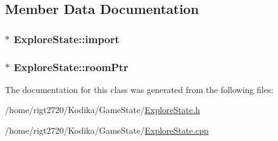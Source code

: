 \subsection{Member Data Documentation}
\hypertarget{classExploreState_aa9bd4b4504c72ae70c440c401f1a60aa}{
\subsubsection[{import}]{$\ast$ Explore\-State\-::import\hspace{0.3cm}{\ttfamily [private]}}}\label{classExploreState_aa9bd4b4504c72ae70c440c401f1a60aa}
\hypertarget{classExploreState_a7863a120d0a1ad5b1ff6d1c77f60cea1}{
\subsubsection[{room\-Ptr}]{$\ast$ Explore\-State\-::room\-Ptr\hspace{0.3cm}{\ttfamily [private]}}}\label{classExploreState_a7863a120d0a1ad5b1ff6d1c77f60cea1}


The documentation for this class was generated from the following files\-:\begin{DoxyCompactItemize}
\item 
/home/rigt2720/\-Kodika/\-Game\-State/\hyperlink{ExploreState_8h}{Explore\-State.\-h}\item 
/home/rigt2720/\-Kodika/\-Game\-State/\hyperlink{ExploreState_8cpp}{Explore\-State.\-cpp}\end{DoxyCompactItemize}
